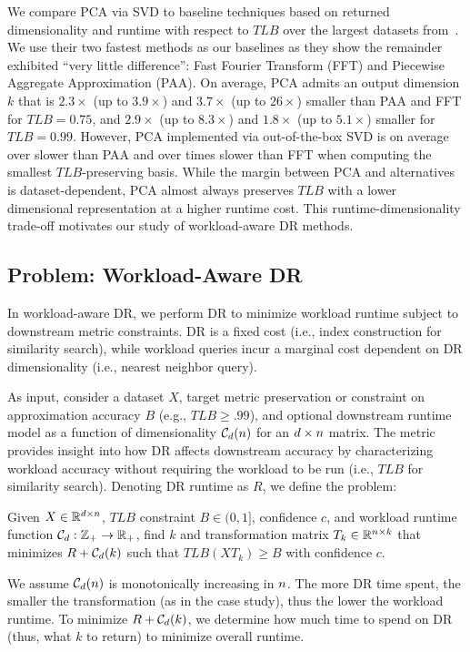 We compare PCA via SVD to baseline techniques based on returned dimensionality and runtime with respect to $TLB$ over the largest datasets from~\cite{keogh-study}. 
We use their two fastest methods as our baselines as they show the remainder exhibited ``very little difference'': Fast Fourier Transform (FFT) and Piecewise Aggregate Approximation (PAA).
On average, PCA admits an output dimension $k$ that is $2.3\times$ (up to $3.9\times$) and $3.7\times$ (up to $26\times$) smaller than PAA and FFT for $TLB = 0.75$, and $2.9\times$ (up to $8.3\times$) and $1.8\times$ (up to $5.1\times$) smaller for $TLB = 0.99$.
However, PCA implemented via out-of-the-box SVD is on average over  slower than PAA and over  times slower than FFT when computing the smallest $TLB$-preserving basis.
While the margin between PCA and alternatives is dataset-dependent, PCA almost always preserves $TLB$ with a lower dimensional representation at a higher runtime cost.
This runtime-dimensionality trade-off motivates our study of workload-aware DR methods. 


\subsection{Problem: Workload-Aware DR}
\label{subsec:wadr}

In workload-aware DR, we perform DR to minimize workload runtime subject to downstream metric constraints.
DR is a fixed cost (i.e., index construction for similarity search), while workload queries incur a marginal cost dependent on DR dimensionality (i.e., nearest neighbor query). 

As input, consider a dataset $X$, target metric preservation or constraint on approximation accuracy $B$ (e.g., $TLB \geq .99$), and optional downstream runtime model as a function of dimensionality $\mathcal{C}_{\color{black}d}({\color{black}n})$ for an ${\color{black}d}\times {\color{black}n}$ matrix.  
The metric provides insight into how DR affects downstream accuracy by characterizing workload accuracy without requiring the workload to be run (i.e., $TLB$ for similarity search). 
Denoting DR runtime as $R$, we define the problem:
\begin{problem}
\label{def:opt}
  Given $X \in \mathbb{R}^{{\color{black}d} \times {\color{black}n}}$, $TLB$ constraint $B \in 
  (0, 1]$, confidence $c$, and workload runtime function $\mathcal{C}_{\color{black}d}:\mathbb{Z}_{+} \rightarrow \mathbb{R}_{+}$, find $k$ and transformation
  matrix $T_k \in \mathbb{R}^{{\color{black}n} \times k}$ that minimizes $R + \mathcal{C}_{\color{black}d}(k)$
  such that $TLB(XT_k) \geq B$ with confidence $c$.
\end{problem}

We assume $\mathcal{C}_{\color{black}d}({\color{black}n})$ is monotonically increasing in ${\color{black}n}$.
The more DR time spent, the smaller the transformation (as in the case study), thus the lower the workload runtime.
To minimize $R + \mathcal{C}_{\color{black}d}(k)$, we  determine how much time to spend on DR (thus, what $k$ to return) to minimize overall runtime.






